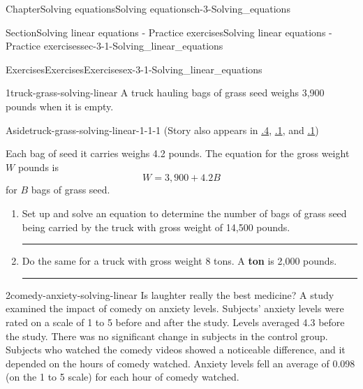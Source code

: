 \documentclass[twoside,11pt,]{book}
\newcommand{\xreffont}{\relax}
\newcommand{\terminology}[1]{\textbf{#1}}
\newlength{\workspacestrutwidth}
\numberwithin{equation}{section}
\begin{document}
\begin{chapterptx}{Chapter}{Solving equations}{}{Solving equations}{}{}{ch-3-Solving_equations}
\renewcommand*{\chaptername}{Chapter}
%
%
\typeout{************************************************}
\typeout{************************************************}
%
\begin{sectionptx}{Section}{Solving linear equations - Practice exercises}{}{Solving linear equations - Practice exercises}{}{}{sec-3-1-Solving_linear_equations}
%
%
\typeout{************************************************}
\typeout{************************************************}
%
\begin{exercises-subsection-numberless}{Exercises}{Exercises}{}{Exercises}{}{}{ex-3-1-Solving_linear_equations}
\begin{divisionexercise}{1}{}{}{truck-grass-solving-linear}%
A truck hauling bags of grass seed weighs 3,900 pounds when it is empty. \begin{aside}{Aside}{}{truck-grass-solving-linear-1-1-1}%
(Story also appears in \hyperlink{truck-grass-arithmetic-operations}{{\xreffont 0.2.4}}, \hyperlink{truck-grass-first-look-linear}{{\xreffont 2.1.1}}, and \hyperlink{truck-grass-linear-ineq}{{\xreffont 3.2.1}})%
\end{aside}
 Each bag of seed it carries weighs 4.2 pounds. The equation for the gross weight \(W\) pounds is%
\begin{equation*}
W = 3{,}900 + 4.2B
\end{equation*}
for \(B\) bags of grass seed.%
\begin{enumerate}[label=(\alph*),ref=\alph*]%
\item{}Set up and solve an equation to determine the number of bags of grass seed being carried by the truck with gross weight of 14,500 pounds.%
\par\rule{\workspacestrutwidth}{2in}%
\item{}Do the same for a truck with gross weight 8 tons. A \terminology{ton} is 2,000 pounds.%
\par\rule{\workspacestrutwidth}{4in}%
\end{enumerate}%
\end{divisionexercise}%
\clearpage
\begin{divisionexercise}{2}{}{}{comedy-anxiety-solving-linear}%
Is laughter really the best medicine? A study examined the impact of comedy on anxiety levels. Subjects' anxiety levels were rated on a scale of 1 to 5 before and after the study. Levels averaged 4.3 before the study. There was no significant change in subjects in the control group. Subjects who watched the comedy videos showed a noticeable difference, and it depended on the hours of comedy watched. Anxiety levels fell an average of 0.098 (on the 1 to 5 scale) for each hour of comedy watched.%

\end{divisionexercise}
\end{exercises-subsection-numberless}
\end{sectionptx}
\end{chapterptx}
\end{document}
